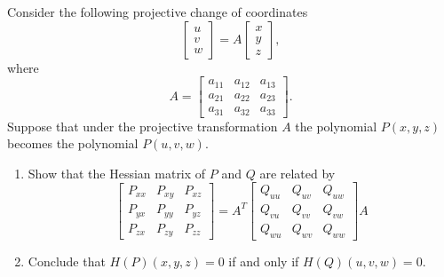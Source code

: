 \begin{tcolorbox}[title=Problem 29, breakable]
    Consider the following projective change of coordinates 
    \[
    \begin{bmatrix}
        u \\ v \\ w
    \end{bmatrix}
    = A 
    \begin{bmatrix}
        x \\ y \\ z
    \end{bmatrix},
    \]
    where 
    \[A = 
    \begin{bmatrix}
        a_{11} & a_{12} & a_{13} \\
        a_{21} & a_{22} & a_{23} \\
        a_{31} & a_{32} & a_{33}
    \end{bmatrix}.\]
    Suppose that under the projective transformation $A$ the polynomial
        $P(x, y, z)$ becomes the polynomial $P(u, v, w)$.
    \begin{enumerate}
        \item Show that the Hessian matrix of $P$ and $Q$ are related by 
        \[
        \begin{bmatrix}
            P_{xx} & P_{xy} & P_{xz} \\
            P_{yx} & P_{yy} & P_{yz} \\
            P_{zx} & P_{zy} & P_{zz}
        \end{bmatrix}
        = A^T 
        \begin{bmatrix}
            Q_{uu} & Q_{uv} & Q_{uw} \\
            Q_{vu} & Q_{vv} & Q_{vw} \\
            Q_{wu} & Q_{wv} & Q_{ww}
        \end{bmatrix}
        A
        \]
        \item Conclude that $H(P)(x, y, z) = 0$ if and only if $H(Q)(u, v, w) = 0$.
    \end{enumerate}
\end{tcolorbox}

